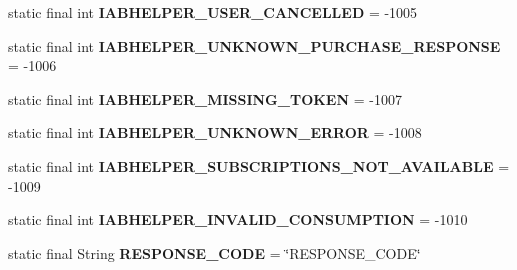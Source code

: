 \begin{DoxyCompactItemize}
\item 
\mbox{\label{classorg_1_1cocos2dx_1_1plugin_1_1util_1_1IabHelper_acaff8757cad7a292d6656688f449934b}} 
static final int {\bfseries I\+A\+B\+H\+E\+L\+P\+E\+R\+\_\+\+U\+S\+E\+R\+\_\+\+C\+A\+N\+C\+E\+L\+L\+ED} = -\/1005
\item 
\mbox{\label{classorg_1_1cocos2dx_1_1plugin_1_1util_1_1IabHelper_a08d346de5c6bd747b9813b83b6bd0478}} 
static final int {\bfseries I\+A\+B\+H\+E\+L\+P\+E\+R\+\_\+\+U\+N\+K\+N\+O\+W\+N\+\_\+\+P\+U\+R\+C\+H\+A\+S\+E\+\_\+\+R\+E\+S\+P\+O\+N\+SE} = -\/1006
\item 
\mbox{\label{classorg_1_1cocos2dx_1_1plugin_1_1util_1_1IabHelper_aabfcf99e50fa69324540c60db2549c77}} 
static final int {\bfseries I\+A\+B\+H\+E\+L\+P\+E\+R\+\_\+\+M\+I\+S\+S\+I\+N\+G\+\_\+\+T\+O\+K\+EN} = -\/1007
\item 
\mbox{\label{classorg_1_1cocos2dx_1_1plugin_1_1util_1_1IabHelper_af2f347cdb977f3a27adf8a7ebf6f320f}} 
static final int {\bfseries I\+A\+B\+H\+E\+L\+P\+E\+R\+\_\+\+U\+N\+K\+N\+O\+W\+N\+\_\+\+E\+R\+R\+OR} = -\/1008
\item 
\mbox{\label{classorg_1_1cocos2dx_1_1plugin_1_1util_1_1IabHelper_a4c38c52d88241e8ad2dcb0dcf6dbecc9}} 
static final int {\bfseries I\+A\+B\+H\+E\+L\+P\+E\+R\+\_\+\+S\+U\+B\+S\+C\+R\+I\+P\+T\+I\+O\+N\+S\+\_\+\+N\+O\+T\+\_\+\+A\+V\+A\+I\+L\+A\+B\+LE} = -\/1009
\item 
\mbox{\label{classorg_1_1cocos2dx_1_1plugin_1_1util_1_1IabHelper_aa0e9d091b3f37c937eaf17aaef07f8a0}} 
static final int {\bfseries I\+A\+B\+H\+E\+L\+P\+E\+R\+\_\+\+I\+N\+V\+A\+L\+I\+D\+\_\+\+C\+O\+N\+S\+U\+M\+P\+T\+I\+ON} = -\/1010
\item 
\mbox{\label{classorg_1_1cocos2dx_1_1plugin_1_1util_1_1IabHelper_a90b3288326755e9326c172db7bec8724}} 
static final String {\bfseries R\+E\+S\+P\+O\+N\+S\+E\+\_\+\+C\+O\+DE} = \char`\"{}R\+E\+S\+P\+O\+N\+S\+E\+\_\+\+C\+O\+DE\char`\"{}

\end{DoxyCompactItemize}
